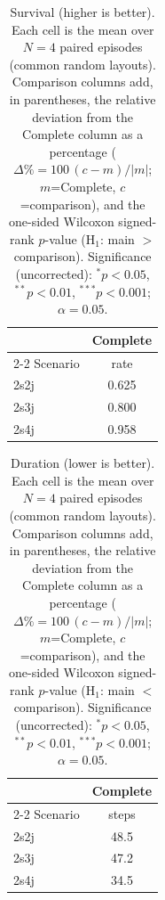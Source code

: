 \begin{table}[ht]
  \centering
  \caption{Survival (higher is better). Each cell is the mean over $N=4$ paired episodes (common random layouts). Comparison columns add, in parentheses, the relative deviation from the Complete column as a percentage ($\Delta\%=100\,(c-m)/|m|$; $m$=Complete, $c$=comparison), and the one-sided Wilcoxon signed-rank $p$-value (H$_1$: main $>$ comparison). Significance (uncorrected): $^{*}p<0.05$, $^{**}p<0.01$, $^{***}p<0.001$; $\alpha=0.05$.}
  \label{tab:wilcoxon-survival}
  \small
  \begin{tabular}{l c}
    \toprule
     & Complete \\
    \cmidrule(lr){2-2}
    Scenario & {rate} \\
    \midrule
    2s2j & 0.625 \\
    2s3j & 0.800 \\
    2s4j & 0.958 \\
    \bottomrule
  \end{tabular}
\end{table}

\begin{table}[ht]
  \centering
  \caption{Duration (lower is better). Each cell is the mean over $N=4$ paired episodes (common random layouts). Comparison columns add, in parentheses, the relative deviation from the Complete column as a percentage ($\Delta\%=100\,(c-m)/|m|$; $m$=Complete, $c$=comparison), and the one-sided Wilcoxon signed-rank $p$-value (H$_1$: main $<$ comparison). Significance (uncorrected): $^{*}p<0.05$, $^{**}p<0.01$, $^{***}p<0.001$; $\alpha=0.05$.}
  \label{tab:wilcoxon-duration}
  \small
  \begin{tabular}{l c}
    \toprule
     & Complete \\
    \cmidrule(lr){2-2}
    Scenario & {steps} \\
    \midrule
    2s2j & 48.5 \\
    2s3j & 47.2 \\
    2s4j & 34.5 \\
    \bottomrule
  \end{tabular}
\end{table}

